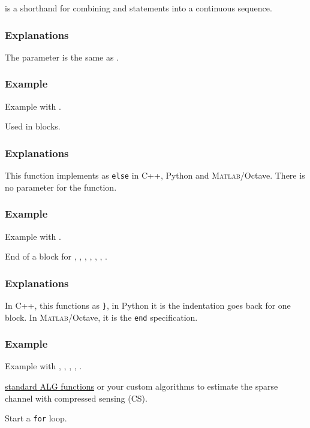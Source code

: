  is a shorthand for combining  and  statements into a continuous sequence.
\subsubsection*{Explanations}
The parameter is the same as .
\subsubsection*{Example}
Example with .

Used in  blocks.
\subsubsection*{Explanations}
This function implements as \texttt{else} in C++, Python and \textsc{Matlab}/Octave.
There is no parameter for the  function.
\subsubsection*{Example}
Example with .

End of a block for , , , , , , .
\subsubsection*{Explanations}
In C++, this functions as \texttt{\}},
in Python it is the indentation goes back for one block.
In \textsc{Matlab}/Octave, it is the \texttt{end} specification.
\subsubsection*{Example}
Example with , , , , .

 \hyperref[d:sec:alg_lib]{standard ALG functions}
or your custom algorithms to estimate the
sparse channel with compressed sensing (CS).

Start a \texttt{for} loop.

